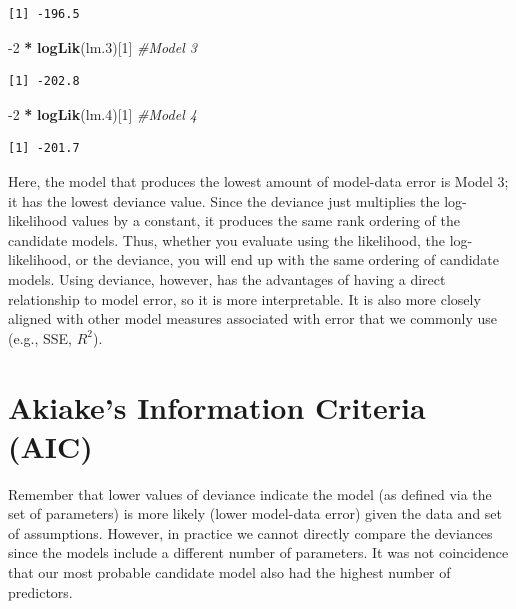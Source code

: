 \documentclass[]{book}
\newenvironment{Shaded}{\begin{snugshade}}{\end{snugshade}}
\newcommand{\CommentTok}[1]{\textcolor[rgb]{0.56,0.35,0.01}{\textit{#1}}}
\newcommand{\DecValTok}[1]{\textcolor[rgb]{0.00,0.00,0.81}{#1}}
\newcommand{\FloatTok}[1]{\textcolor[rgb]{0.00,0.00,0.81}{#1}}
\newcommand{\KeywordTok}[1]{\textcolor[rgb]{0.13,0.29,0.53}{\textbf{#1}}}
\newcommand{\NormalTok}[1]{#1}
\newcommand{\OperatorTok}[1]{\textcolor[rgb]{0.81,0.36,0.00}{\textbf{#1}}}
\newcommand{\StringTok}[1]{\textcolor[rgb]{0.31,0.60,0.02}{#1}}
\begin{document}
\begin{verbatim}
[1] -196.5
\end{verbatim}

\begin{Shaded}
\begin{Highlighting}[]
\DecValTok{-2} \OperatorTok{*}\StringTok{ }\KeywordTok{logLik}\NormalTok{(lm}\FloatTok{.3}\NormalTok{)[}\DecValTok{1}\NormalTok{] }\CommentTok{#Model 3}
\end{Highlighting}
\end{Shaded}

\begin{verbatim}
[1] -202.8
\end{verbatim}

\begin{Shaded}
\begin{Highlighting}[]
\DecValTok{-2} \OperatorTok{*}\StringTok{ }\KeywordTok{logLik}\NormalTok{(lm}\FloatTok{.4}\NormalTok{)[}\DecValTok{1}\NormalTok{] }\CommentTok{#Model 4}
\end{Highlighting}
\end{Shaded}

\begin{verbatim}
[1] -201.7
\end{verbatim}

Here, the model that produces the lowest amount of model-data error is Model 3; it has the lowest deviance value. Since the deviance just multiplies the log-likelihood values by a constant, it produces the same rank ordering of the candidate models. Thus, whether you evaluate using the likelihood, the log-likelihood, or the deviance, you will end up with the same ordering of candidate models. Using deviance, however, has the advantages of having a direct relationship to model error, so it is more interpretable. It is also more closely aligned with other model measures associated with error that we commonly use (e.g., SSE, \(R^2\)).

\hypertarget{akiakes-information-criteria-aic}{%
\section{Akiake's Information Criteria (AIC)}\label{akiakes-information-criteria-aic}}

Remember that lower values of deviance indicate the model (as defined via the set of parameters) is more likely (lower model-data error) given the data and set of assumptions. However, in practice we cannot directly compare the deviances since the models include a different number of parameters. It was not coincidence that our most probable candidate model also had the highest number of predictors.
\end{document}
